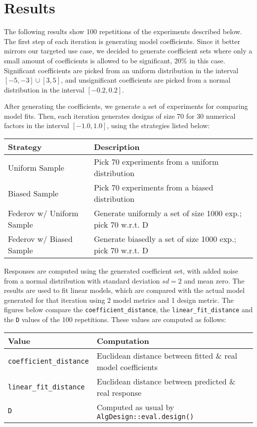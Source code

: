 \documentclass[11pt]{article}
\begin{document}
\section{Results}
\label{sec:org348dbca}
The following results show 100 repetitions of the experiments described below.
The first step of each iteration is generating model coefficients. Since it
better mirrors our targeted use case, we decided to generate coefficient sets
where only a small amount of coefficients is allowed to be significant, 20\% in
this case. Significant coefficients are picked from an uniform distribution in
the interval \([-5, -3] \cup [3, 5]\), and unsignificant coefficients are picked
from a normal distribution in the interval \([-0.2, 0.2]\).

After generating the coefficients, we generate a set of experiments for
comparing model fits. Then, each iteration generates designs of size 70 for 30
numerical factors in the interval \([-1.0, 1.0]\), using the strategies listed
below:

\begin{center}
\begin{tabular}{p{}p{}}
Strategy & Description\\
\hline
Uniform Sample & Pick 70 experiments from a uniform distribution\\
Biased Sample & Pick 70 experiments from a biased distribution\\
Federov w/ Uniform Sample & Generate uniformly a set of size 1000 exp.; pick 70 w.r.t. D\\
Federov w/ Biased Sample & Generate biasedly a set of size 1000 exp.; pick 70 w.r.t. D\\
\end{tabular}
\end{center}

Responses are computed using the generated coefficient set, with added noise
from a normal distribution with standard deviation \(sd = 2\) and mean zero. The
results are used to fit linear models, which are compared with the actual model
generated for that iteration using 2 model metrics and 1 design metric. The
figures below compare the \texttt{coefficient\_distance}, the \texttt{linear\_fit\_distance} and
the \texttt{D} values of the 100 repetitions. These values are computed as follows:

\begin{center}
\begin{tabular}{ll}
Value & Computation\\
\hline
\texttt{coefficient\_distance} & Euclidean distance between fitted \& real model coefficients\\
\texttt{linear\_fit\_distance} & Euclidean distance between predicted \& real response\\
\texttt{D} & Computed as usual by \texttt{AlgDesign::eval.design()}\\
\end{tabular}
\end{center}
\end{document}
